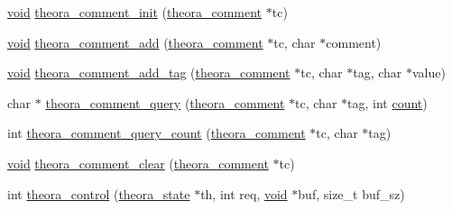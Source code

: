 \begin{DoxyCompactItemize}
\item 
\hyperlink{png_8h_ac9c84fa68bbad002983e35ce3663c686}{void} \hyperlink{group__oldfuncs_ga811b92785df3bdbbebb3de612d9d6ce0}{theora\+\_\+comment\+\_\+init} (\hyperlink{structtheora__comment}{theora\+\_\+comment} $\ast$tc)
\item 
\hyperlink{png_8h_ac9c84fa68bbad002983e35ce3663c686}{void} \hyperlink{group__oldfuncs_ga650642ed23894e41109bbc42ec393ed4}{theora\+\_\+comment\+\_\+add} (\hyperlink{structtheora__comment}{theora\+\_\+comment} $\ast$tc, char $\ast$comment)
\item 
\hyperlink{png_8h_ac9c84fa68bbad002983e35ce3663c686}{void} \hyperlink{group__oldfuncs_ga339bd80b5bf4bb168b7052d8ec0b5a92}{theora\+\_\+comment\+\_\+add\+\_\+tag} (\hyperlink{structtheora__comment}{theora\+\_\+comment} $\ast$tc, char $\ast$tag, char $\ast$value)
\item 
char $\ast$ \hyperlink{group__oldfuncs_ga4361f6001abb5c83c36a2ddfb648a8dc}{theora\+\_\+comment\+\_\+query} (\hyperlink{structtheora__comment}{theora\+\_\+comment} $\ast$tc, char $\ast$tag, int \hyperlink{_core_8c_ad43c3812e6d13e0518d9f8b8f463ffcf}{count})
\item 
int \hyperlink{group__oldfuncs_ga10f66a3c752442a3e0c0098e0f88df8b}{theora\+\_\+comment\+\_\+query\+\_\+count} (\hyperlink{structtheora__comment}{theora\+\_\+comment} $\ast$tc, char $\ast$tag)
\item 
\hyperlink{png_8h_ac9c84fa68bbad002983e35ce3663c686}{void} \hyperlink{group__oldfuncs_ga04c07c2eefba3a433e43f9fbde14719f}{theora\+\_\+comment\+\_\+clear} (\hyperlink{structtheora__comment}{theora\+\_\+comment} $\ast$tc)
\item 
int \hyperlink{group__oldfuncs_ga186773db3bc8cd550047e7df1b2ba2c9}{theora\+\_\+control} (\hyperlink{structtheora__state}{theora\+\_\+state} $\ast$th, int req, \hyperlink{png_8h_ac9c84fa68bbad002983e35ce3663c686}{void} $\ast$buf, size\+\_\+t buf\+\_\+sz)
\end{DoxyCompactItemize}
